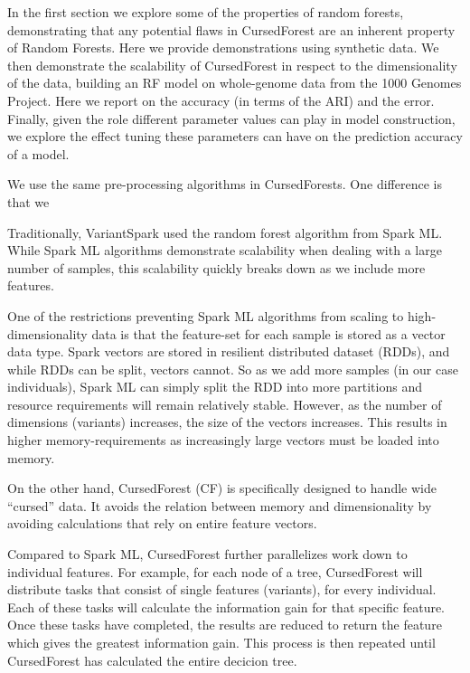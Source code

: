 \documentclass[10pt,a4paper]{article}  %
\begin{document}
In the first section we explore some of the properties of random forests, demonstrating that any potential flaws in CursedForest
are an inherent property of Random Forests. Here we provide demonstrations using synthetic data.
We then demonstrate the scalability of CursedForest in respect to the dimensionality of the data, building an RF model on whole-genome
data from the 1000 Genomes Project. Here we report on the accuracy (in terms of the ARI) and the error.
Finally, given the role different parameter values can play in model construction, we explore the effect tuning these parameters
can have on the prediction accuracy of a model.



We use the same pre-processing algorithms in CursedForests. One difference is that we 



Traditionally, VariantSpark used the random forest algorithm from Spark ML. While Spark ML algorithms demonstrate
scalability when dealing with a large number of samples, this scalability quickly breaks down as we include more features.

One of the restrictions preventing Spark ML algorithms from scaling to high-dimensionality data is that the feature-set
for each sample is stored as a vector data type. Spark vectors are stored in resilient distributed dataset (RDDs), and while RDDs
can be split, vectors cannot. So as we add more samples (in our case individuals), Spark ML can simply split the RDD into more
partitions and resource requirements will remain relatively stable. However, as the number of dimensions (variants) increases,
the size of the vectors increases. This results in higher memory-requirements as increasingly large vectors must be loaded
into memory.

On the other hand, CursedForest (CF) is specifically designed to handle wide ``cursed'' data. It avoids the relation between
memory and dimensionality by avoiding calculations that rely on entire feature vectors.

Compared to Spark ML, CursedForest further parallelizes work down to individual features. 
For example, for each node of a tree, CursedForest will distribute tasks that consist of single features (variants), for every individual.
Each of these tasks will calculate the information gain for that specific feature.
Once these tasks have completed, the results are reduced to return the feature which gives the greatest information gain.
This process is then repeated until CursedForest has calculated the entire decicion tree.
\end{document}
